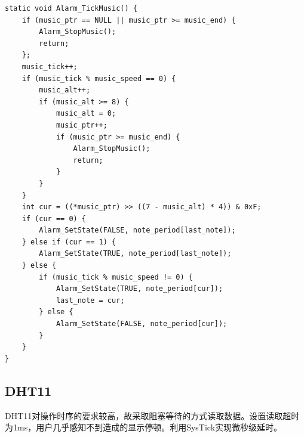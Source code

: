 \documentclass[a4paper,11pt,UTF8]{ctexart}
\begin{document}
\begin{lstlisting}[caption={音乐解码播放},captionpos=b]
static void Alarm_TickMusic() {
    if (music_ptr == NULL || music_ptr >= music_end) {
        Alarm_StopMusic();
        return;
    };
    music_tick++;
    if (music_tick % music_speed == 0) {
        music_alt++;
        if (music_alt >= 8) {
            music_alt = 0;
            music_ptr++;
            if (music_ptr >= music_end) {
                Alarm_StopMusic();
                return;
            }
        }
    }
    int cur = ((*music_ptr) >> ((7 - music_alt) * 4)) & 0xF;
    if (cur == 0) {
        Alarm_SetState(FALSE, note_period[last_note]);
    } else if (cur == 1) {
        Alarm_SetState(TRUE, note_period[last_note]);
    } else {
        if (music_tick % music_speed != 0) {
            Alarm_SetState(TRUE, note_period[cur]);
            last_note = cur;
        } else {
            Alarm_SetState(FALSE, note_period[cur]);
        }
    }
}
\end{lstlisting}

\subsection{DHT11}

DHT11对操作时序的要求较高，故采取阻塞等待的方式读取数据。设置读取超时为1ms，用户几乎感知不到造成的显示停顿。利用SysTick实现微秒级延时。
\end{document}
